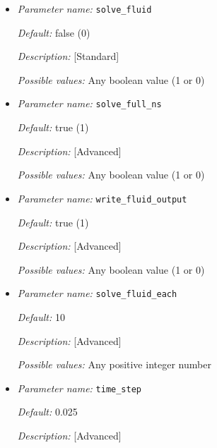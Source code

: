 \begin{itemize}
{\it Description:} [Standard] 

{\it Possible values:} Any boolean value (1 or 0)


\item {\it Parameter name:} {\tt solve\_fluid}
\label{parameters:solve_fluid}


{\it Default:} false (0)

{\it Description:} [Standard] 

{\it Possible values:} Any boolean value (1 or 0)


\item {\it Parameter name:} {\tt solve\_full\_ns}
\label{parameters:solve_full_ns}


{\it Default:} true (1)

{\it Description:} [Advanced] 

{\it Possible values:} Any boolean value (1 or 0)


\item {\it Parameter name:} {\tt write\_fluid\_output}
\label{parameters:write_fluid_output}


{\it Default:} true (1)

{\it Description:} [Advanced] 

{\it Possible values:} Any boolean value (1 or 0)


\item {\it Parameter name:} {\tt solve\_fluid\_each}
\label{parameters:solve_fluid_each}


{\it Default:} 10

{\it Description:} [Advanced] 

{\it Possible values:} Any positive integer number


\item {\it Parameter name:} {\tt time\_step}
\label{parameters:time_step}


{\it Default:} 0.025

{\it Description:} [Advanced] 


\end{itemize}
